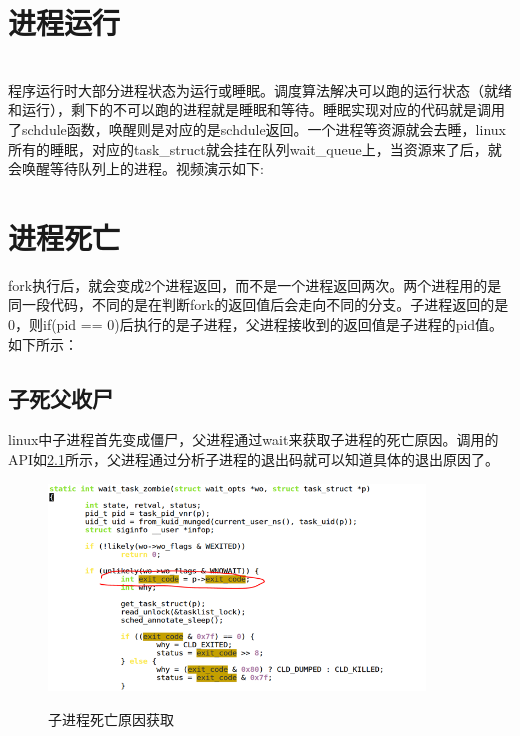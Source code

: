 \chapter{进程运行}
~\\程序运行时大部分进程状态为运行或睡眠。调度算法解决可以跑的运行状态（就绪和运行），剩下的不可以跑的进程就是睡眠和等待。睡眠实现对应的代码就是调用了schdule函数，唤醒则是对应的是schdule返回。一个进程等资源就会去睡，linux所有的睡眠，对应的task\_struct就会挂在队列wait\_queue上，当资源来了后，就会唤醒等待队列上的进程。视频演示如下:
\begin{tcolorbox}[colback=blue!5,colframe=blue!75!black,title=等待队列视频]
\end{tcolorbox}


\chapter{进程死亡}
fork执行后，就会变成2个进程返回，而不是一个进程返回两次。两个进程用的是同一段代码，不同的是在判断fork的返回值后会走向不同的分支。子进程返回的是0，则if(pid == 0)后执行的是子进程，父进程接收到的返回值是子进程的pid值。如下所示：


\section{子死父收尸}
linux中子进程首先变成僵尸，父进程通过wait来获取子进程的死亡原因。调用的API如\ref{child_wait}所示，父进程通过分析子进程的退出码就可以知道具体的退出原因了。

\begin{figure}[H]
 \wdfigbox
  {\caption{子进程死亡原因获取}\label{child_wait}}
  {
  \includegraphics[width=10cm]{./figure/child_wait.png}
  }
\end{figure}

